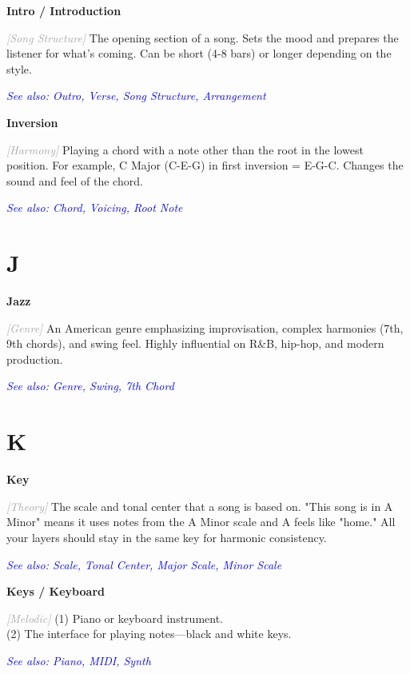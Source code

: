 \documentclass[11pt,letterpaper]{article}
\newcommand{\term}[1]{\textbf{\large\color{purple}#1}}
\newcommand{\category}[1]{\textcolor{darkgray}{\textit{\small [#1]}}}
\newcommand{\seealso}[1]{\textcolor{blue}{\textit{See also: #1}}}
\newenvironment{termdef}[1]
  {\noindent\term{#1}\par\nopagebreak}
  {\par\vspace{0.3em}}
\begin{document}
\begin{termdef}{Intro / Introduction}
\category{Song Structure}
The opening section of a song. Sets the mood and prepares the listener for what's coming. Can be short (4-8 bars) or longer depending on the style.

\seealso{Outro, Verse, Song Structure, Arrangement}
\end{termdef}

\begin{termdef}{Inversion}
\category{Harmony}
Playing a chord with a note other than the root in the lowest position. For example, C Major (C-E-G) in first inversion = E-G-C. Changes the sound and feel of the chord.

\seealso{Chord, Voicing, Root Note}
\end{termdef}

\newpage


\section*{J}

\begin{termdef}{Jazz}
\category{Genre}
An American genre emphasizing improvisation, complex harmonies (7th, 9th chords), and swing feel. Highly influential on R\&B, hip-hop, and modern production.

\seealso{Genre, Swing, 7th Chord}
\end{termdef}

\section*{K}

\begin{termdef}{Key}
\category{Theory}
The scale and tonal center that a song is based on. "This song is in A Minor" means it uses notes from the A Minor scale and A feels like "home." All your layers should stay in the same key for harmonic consistency.

\seealso{Scale, Tonal Center, Major Scale, Minor Scale}
\end{termdef}

\begin{termdef}{Keys / Keyboard}
\category{Melodic}
(1) Piano or keyboard instrument. \\
(2) The interface for playing notes—black and white keys.

\seealso{Piano, MIDI, Synth}
\end{termdef}
\end{document}
